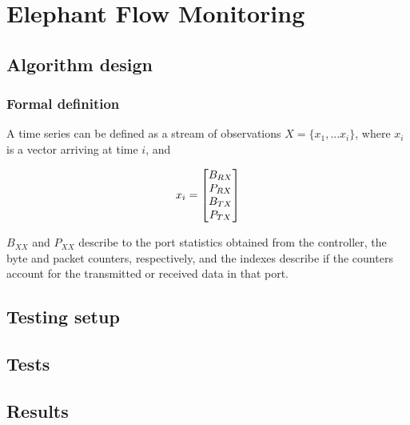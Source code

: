 \chapter{Elephant Flow Monitoring} \label{chap:me} %

\section {Algorithm design}
\subsection {Formal definition}

A time series can be defined as a stream of observations $X = \{x_1, ... x_i\}$, where $x_i$ is a vector arriving at time $i$, and

\begin {equation}
\centering
x_i = 
\begin{bmatrix}
B_{RX}\\
P_{RX}\\
B_{TX}\\
P_{TX}\\
\end{bmatrix}
\end {equation}

\par $B_{XX}$ and $P_{XX}$ describe to the port statistics obtained from the controller, the byte and packet counters, respectively, and the indexes describe if the counters account for the transmitted or received data in that port.
\section {Testing setup}
\section {Tests}
\section {Results}

